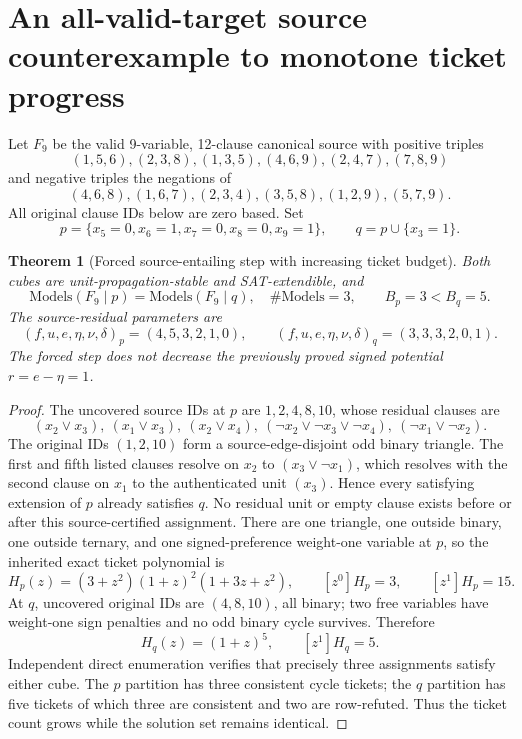 \documentclass[11pt]{article}
\newtheorem{theorem}{Theorem}
\begin{document}
\section{An all-valid-target source counterexample to monotone ticket progress}
Let $F_9$ be the valid 9-variable, 12-clause canonical source with positive triples
\[
(1,5,6),(2,3,8),(1,3,5),(4,6,9),(2,4,7),(7,8,9)
\]
and negative triples the negations of
\[
(4,6,8),(1,6,7),(2,3,4),(3,5,8),(1,2,9),(5,7,9).
\]
All original clause IDs below are zero based. Set
\[
p=\{x_5=0,x_6=1,x_7=0,x_8=0,x_9=1\},\qquad
q=p\cup\{x_3=1\}.
\]
\begin{theorem}[Forced source-entailing step with increasing ticket budget]\label{thm:one}
Both cubes are unit-propagation-stable and SAT-extendible, and
\[
\mathrm{Models}(F_9\mid p)=\mathrm{Models}(F_9\mid q),
\quad \#\mathrm{Models}=3,\qquad
\boxed{B_p=3<B_q=5.}
\]
The source-residual parameters are
\[
(f,u,e,\eta,\nu,\delta)_p=(4,5,3,2,1,0),
\qquad
(f,u,e,\eta,\nu,\delta)_q=(3,3,3,2,0,1).
\]
The forced step does not decrease the previously proved signed potential $r=e-\eta=1$.
\end{theorem}
\begin{proof}
The uncovered source IDs at $p$ are $1,2,4,8,10$, whose residual clauses are
\[
(x_2\vee x_3),\ (x_1\vee x_3),\ (x_2\vee x_4),\
(\neg x_2\vee\neg x_3\vee\neg x_4),\
(\neg x_1\vee\neg x_2).
\]
The original IDs $(1,2,10)$ form a source-edge-disjoint odd binary triangle. The first and fifth listed clauses resolve on $x_2$ to $(x_3\vee\neg x_1)$, which resolves with the second clause on $x_1$ to the authenticated unit $(x_3)$. Hence every satisfying extension of $p$ already satisfies $q$. No residual unit or empty clause exists before or after this source-certified assignment.
There are one triangle, one outside binary, one outside ternary, and one signed-preference weight-one variable at $p$, so the inherited exact ticket polynomial is
\[
H_p(z)=(3+z^2)(1+z)^2(1+3z+z^2),
\qquad [z^0]H_p=3,\qquad [z^1]H_p=15.
\]
At $q$, uncovered original IDs are $(4,8,10)$, all binary; two free variables have weight-one sign penalties and no odd binary cycle survives. Therefore
\[
H_q(z)=(1+z)^5,\qquad [z^1]H_q=5.
\]
Independent direct enumeration verifies that precisely three assignments satisfy either cube. The $p$ partition has three consistent cycle tickets; the $q$ partition has five tickets of which three are consistent and two are row-refuted. Thus the ticket count grows while the solution set remains identical.
\end{proof}
\end{document}
